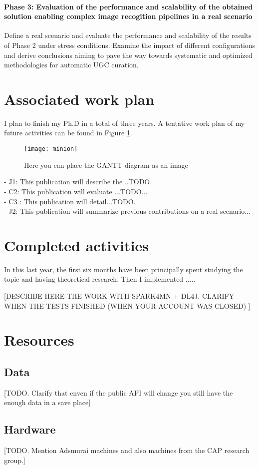\paragraph{Phase 3: Evaluation of the performance and scalability of the obtained solution enabling complex image recogition pipelines in a real scenario}
Define a real scenario and evaluate the performance and scalability of the results of Phase 2 under stress conditions. Examine the impact of different configurations and derive conclusions aiming to pave the way towards systematic and optimized methodologies for automatic UGC curation.


\section{Associated work plan}

I plan to finish my Ph.D in a total of three years. A tentative work plan of my future activities can be found in Figure \ref{gantt}. 

\begin{landscape}

\begin{figure}[b] 
\centering    
\texttt{[image: minion]}
\caption[Minion]{Here you can place the GANTT diagram as an image}
\label{gantt}
\end{figure}

\end{landscape}


- J1: This publication will describe the ..TODO.\\
- C2: This publication will evaluate ...TODO...\\
- C3 : This publication will detail...TODO.\\
- J2: This publication will summarize previous contributions on a real scenario...\\


\section{Completed activities}
In this last year, the first six months have been principally spent studying the topic and having theoretical research. Then I implemented ..... 

[DESCRIBE HERE THE WORK WITH SPARK4MN + DL4J. CLARIFY WHEN THE TESTS FINISHED (WHEN YOUR ACCOUNT WAS CLOSED) ]


\section{Resources}

\subsection{Data}

[TODO. Clarify that enven if the public API will change you still have the enough data in a save place]

\subsection{Hardware}

[TODO. Mention Adsmurai machines and also machines from the CAP research group.]
